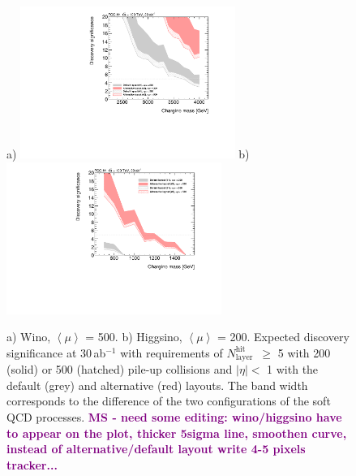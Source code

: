\documentclass[11pt,twoside,a4paper]{cernrep}
\newcommand{\MS}[1]{\textbf{\textcolor{purple}{MS - #1}}}
\begin{document}
\begin{figure}
  \centering
  a)
  \includegraphics[width=7cm]{h_Significance_wino12_eta_5hits.pdf}
  b)
  \includegraphics[width=7cm]{h_Significance_higgsino12_eta_5hits.pdf}
  \caption{ a) Wino, $\left< \mu\right>$ {=} 500. b) Higgsino, $\left< \mu\right>$ {=} 200. Expected discovery significance at 30\,ab${}^{-1}$ with requirements of \ensuremath{N_{\mathrm{layer}}^{\mathrm{hit}}}~$\geq$ 5 with 200 (solid) or 500 (hatched) pile-up collisions and $|\eta|<$ 1 with the default (grey) and alternative (red) layouts.
            The band width corresponds to the difference of the two configurations of the soft QCD processes. \MS{need some editing: wino/higgsino have to appear on the plot, thicker 5sigma line, smoothen curve, instead of alternative/default layout write 4-5 pixels tracker...}
          }
  \label{figure:SignificanceEta1}
\end{figure}
\end{document}

